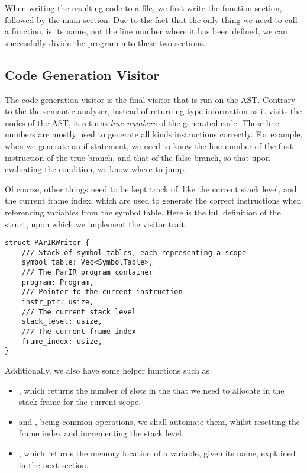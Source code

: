 When writing the resulting  code to a file, we first write the
function section, followed by the main section. Due to the fact that the only
thing we need to call a function, is its name, not the line number where it has
been defined, we can successfully divide the program into these two sections.




\newpage

\subsection{Code Generation Visitor}

The code generation visitor is the final visitor that is run on the AST.
Contrary to the the semantic analyser, instead of returning type information as
it visits the nodes of the AST, it returns \textit{line numbers} of the
generated  code. These line numbers are mostly used to generate all
kinds  instructions correctly. For example, when we generate an if
statement, we need to know the line number of the first instruction of the true
branch, and that of the false branch, so that upon evaluating the condition, we
know where to jump.

Of course, other things need to be kept track of, like the current stack level,
and the current frame index, which are used to generate the correct 
instructions when referencing variables from the symbol table. Here is the full
definition of the  struct, upon which we implement the visitor
trait.

\begin{mainbox}{}
    \lstset{xleftmargin=.1\textwidth, aboveskip=0pt, belowskip=0pt}
    \begin{lstlisting}
struct PArIRWriter {
    /// Stack of symbol tables, each representing a scope
    symbol_table: Vec<SymbolTable>,
    /// The ParIR program container
    program: Program,
    /// Pointer to the current instruction
    instr_ptr: usize,
    /// The current stack level
    stack_level: usize,
    /// The current frame index
    frame_index: usize,
}
\end{lstlisting}
\end{mainbox}

Additionally, we also have some helper functions such as

\begin{itemize}
    \item {}, which returns the number of slots in
          the that we need to allocate in the stack frame for the current scope.
    \item {} and , being common operations, we shall automate them, whilst
          resetting the frame index and incrementing the stack level.
    \item     {}, which returns the memory
          location of a variable, given its name, explained in the next section.
\end{itemize}

